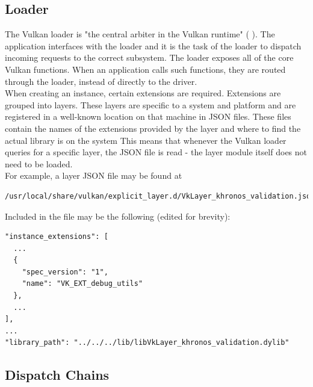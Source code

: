 \documentclass[12pt]{report}
\newcommand{\citebu}[1]{(\citenoparen{#1})}
\newcommand{\citenoparen}[1]{\citeauthor{#1} \citeyear{#1}}
\theoremstyle{definition}
\begin{document}
      \subsection{Loader}

      The Vulkan loader is "the central arbiter in the Vulkan runtime" \citebu{renderdoc}.
      The application interfaces with the loader and it is the task of the
      loader to dispatch incoming requests to the correct subsystem. The
      loader exposes all of the core Vulkan functions. When an application
      calls such functions, they are routed through the loader, instead of
      directly to the driver. \\

      When creating an instance, certain extensions are required. Extensions
      are grouped into layers. These layers are specific to a system and
      platform and are registered in a well-known location on that machine
      in JSON files. These files contain the names of the extensions provided
      by the layer and where to find the actual library is on the system This
      means that whenever the Vulkan loader queries for a specific layer, the
      JSON file is read - the layer module itself does not need to be loaded. \\

      For example, a layer JSON file may be found at \\

      \begin{centering}
        \begin{Verbatim}[fontsize=\small]
/usr/local/share/vulkan/explicit_layer.d/VkLayer_khronos_validation.json
        \end{Verbatim}
      \end{centering}

      Included in the file may be the following (edited for brevity):

      \begin{centering}
        \begin{Verbatim}[fontsize=\small]
"instance_extensions": [
  ...
  {   
    "spec_version": "1", 
    "name": "VK_EXT_debug_utils"
  },
  ...
],
...
"library_path": "../../../lib/libVkLayer_khronos_validation.dylib"
        \end{Verbatim}
      \end{centering}


      \subsection{Dispatch Chains}
\end{document}
